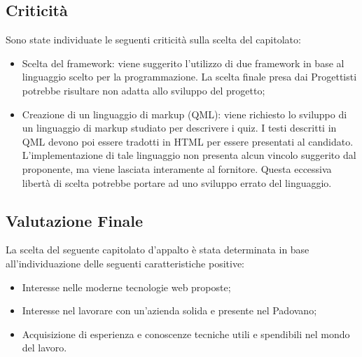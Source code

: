 \subsection{Criticità}
Sono state individuate le seguenti criticità sulla scelta del capitolato:
\begin{itemize}
\item \textsf{Scelta del framework:} viene suggerito l’utilizzo di due framework in base al linguaggio scelto per la programmazione. La scelta finale presa dai Progettisti potrebbe risultare non adatta allo sviluppo del progetto;
\item \textsf{Creazione di un linguaggio di markup (QML):} viene richiesto lo sviluppo di un linguaggio di markup studiato per descrivere i quiz. I testi descritti in QML devono poi essere tradotti in HTML per essere presentati al candidato. L’implementazione di tale linguaggio non presenta alcun vincolo suggerito dal proponente, ma viene lasciata interamente al fornitore. Questa eccessiva libertà di scelta potrebbe portare ad uno sviluppo errato del linguaggio.
\end{itemize}

\subsection{Valutazione Finale}
La scelta del seguente capitolato d’appalto è stata determinata in base all’individuazione delle seguenti caratteristiche positive:
\begin{itemize} 
\item Interesse nelle moderne tecnologie web proposte;
\item Interesse nel lavorare con un'azienda solida e presente nel Padovano;
\item Acquisizione di esperienza e conoscenze tecniche utili e spendibili nel mondo del lavoro.
\end{itemize}
